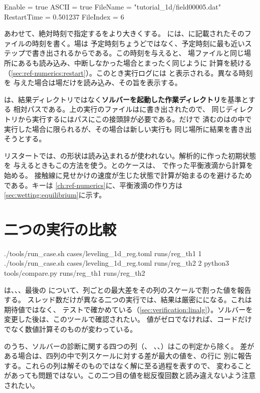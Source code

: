 \begin{toml}
[Restart]
Enable      = true
ASCII       = true
FileName    = "tutorial_1d/field00005.dat"
RestartTime = 0.501237
FileIndex   = 6
\end{toml}

あわせて、絶対時刻で指定するをより大きくする。
には、に記載されたそのファイルの時刻を書く。場は
予定時刻ちょうどではなく、予定時刻に最も近いステップで書き出されるからである。この時刻を与えると、
場ファイルと同じ場所にあるも読み込み、中断しなかった場合とまったく同じように
計算を続ける（\cref{sec:ref-numerics:restart}）。このとき実行ログには
と表示される。異なる時刻を
与えた場合は場だけを読み込み、その旨を表示する。

は、結果ディレクトリではなく\textbf{ソルバーを起動した作業ディレクトリ}を基準とする
相対パスである。上の実行のファイルはに書き出されたので、
同じディレクトリから実行するにはパスにこの接頭辞が必要である。だけで
済むのはの中で実行した場合に限られるが、その場合は新しい実行も
同じ場所に結果を書き出そうとする。

リスタートでは、の形状は読み込まれるが使われない。解析的に作った初期状態を
与えるときもこの方法を使う。とのケースは、
で作った平衡液滴から計算を始める。
接触線に見せかけの速度が生じた状態で計算が始まるのを避けるためである。キーは
\cref{ch:ref-numerics}に、平衡液滴の作り方は\cref{sec:wetting:equilibrium}に示す。

\section{二つの実行の比較}
\label{sec:firstrun:compare}

\begin{shell}
./tools/run_case.sh cases/leveling_1d_reg.toml runs/reg_th1 1
./tools/run_case.sh cases/leveling_1d_reg.toml runs/reg_th2 2
python3 tools/compare.py runs/reg_th1 runs/reg_th2
\end{shell}

は、、、最後の
について、列ごとの最大差をその列のスケールで割った値を報告する。
スレッド数だけが異なる二つの実行では、結果は厳密にになる。これは期待値ではなく、
テストで確かめている（\cref{sec:verification:linalg}）。ソルバーを変更した後は、このツールで確認されたい。
値がゼロでなければ、コードだけでなく数値計算そのものが変わっている。

のうち、ソルバーの診断に関する四つの列（、
、、）はこの判定から除く。
差がある場合は、四列の中で列スケールに対する差が最大の値を、の行に
別に報告する。これらの列は解そのものではなく解に至る過程を表すので、
変わることがあっても問題ではない。この二つ目の値を総反復回数と読み違えないよう注意されたい。
